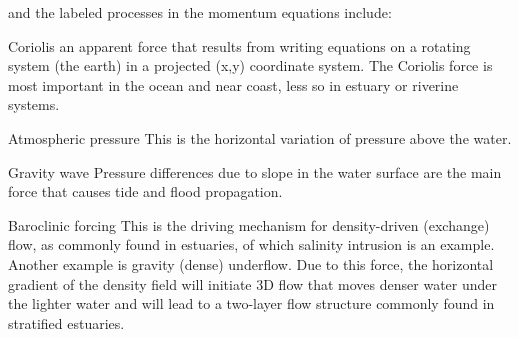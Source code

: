 and the labeled processes in the momentum equations include:
\begin{description}
    \item{Coriolis} an apparent force that results from writing equations on a rotating system (the earth) in a projected (x,y) coordinate system. The Coriolis force is most important in the ocean and near coast, less so in estuary or riverine systems. 
	  \item{Atmospheric pressure} This is the horizontal variation of pressure above the water.
		\item{Gravity wave} Pressure differences due to slope in the water surface are the main force that causes tide and flood propagation. 
	  \item{Baroclinic forcing} This is the driving mechanism for density-driven (exchange) flow, as
commonly found in estuaries, of which salinity intrusion is an example. Another example is gravity (dense) underflow. Due to this force, the horizontal gradient of the density field will initiate 3D flow that moves denser water under the lighter water and will lead to a two-layer flow structure commonly found in stratified estuaries. 
\end{description}

